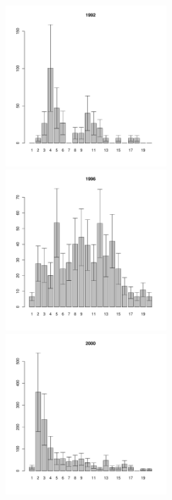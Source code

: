 \documentclass[12pt, a4paper]{article}
\begin{document}
\begin{figure}[h]

\begin{multicols}{3}
\hfill
\includegraphics[width=60mm]{../White_Sea/Luvenga_II_razrez/low_beatch_1992_.pdf}
\hfill
\includegraphics[width=60mm]{../White_Sea/Luvenga_II_razrez/low_beatch_1996_.pdf}
\hfill
\includegraphics[width=60mm]{../White_Sea/Luvenga_II_razrez/low_beatch_2000_.pdf}
\end{multicols}




\end{figure}
\end{document}
